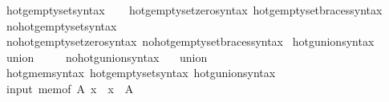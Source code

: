 \begin{isabellebody}
\isanewline
\isanewline
{}\isamarkupfalse%
\ hotg{\isacharunderscore}{\kern0pt}emptyset{\isacharunderscore}{\kern0pt}syntax\isanewline
{}\isanewline
\ \ \isamarkupfalse%
\ hotg{\isacharunderscore}{\kern0pt}emptyset{\isacharunderscore}{\kern0pt}zero{\isacharunderscore}{\kern0pt}syntax\ hotg{\isacharunderscore}{\kern0pt}emptyset{\isacharunderscore}{\kern0pt}braces{\isacharunderscore}{\kern0pt}syntax\isanewline
{}\isamarkupfalse%
\isanewline
{}\isamarkupfalse%
\ no{\isacharunderscore}{\kern0pt}hotg{\isacharunderscore}{\kern0pt}emptyset{\isacharunderscore}{\kern0pt}syntax\isanewline
{}\isanewline
\ \ \isamarkupfalse%
\ no{\isacharunderscore}{\kern0pt}hotg{\isacharunderscore}{\kern0pt}emptyset{\isacharunderscore}{\kern0pt}zero{\isacharunderscore}{\kern0pt}syntax\ no{\isacharunderscore}{\kern0pt}hotg{\isacharunderscore}{\kern0pt}emptyset{\isacharunderscore}{\kern0pt}braces{\isacharunderscore}{\kern0pt}syntax\isanewline
{}\isamarkupfalse%
\isanewline
\isanewline
{}\isamarkupfalse%
\ hotg{\isacharunderscore}{\kern0pt}union{\isacharunderscore}{\kern0pt}syntax\ \ \isamarkupfalse%
\ union\ {\isacharparenleft}{\kern0pt}{\isachardoublequoteopen}{\isasymUnion}{\isacharunderscore}{\kern0pt}{\isachardoublequoteclose}\ {\isacharbrackleft}{\kern0pt}{}{}{\isacharbrackright}{\kern0pt}\ {}{}{\isacharparenright}{\kern0pt}\ \isamarkupfalse%
\isanewline
{}\isamarkupfalse%
\ no{\isacharunderscore}{\kern0pt}hotg{\isacharunderscore}{\kern0pt}union{\isacharunderscore}{\kern0pt}syntax\ \ \isamarkupfalse%
\ union\ {\isacharparenleft}{\kern0pt}{\isachardoublequoteopen}{\isasymUnion}{\isacharunderscore}{\kern0pt}{\isachardoublequoteclose}\ {\isacharbrackleft}{\kern0pt}{}{}{\isacharbrackright}{\kern0pt}\ {}{}{\isacharparenright}{\kern0pt}\ \isamarkupfalse%
\isanewline
\isanewline
{}\isamarkupfalse%
\ hotg{\isacharunderscore}{\kern0pt}mem{\isacharunderscore}{\kern0pt}syntax\ hotg{\isacharunderscore}{\kern0pt}emptyset{\isacharunderscore}{\kern0pt}syntax\ hotg{\isacharunderscore}{\kern0pt}union{\isacharunderscore}{\kern0pt}syntax\isanewline
\isanewline
{}\isamarkupfalse%
\ {\isacharparenleft}{\kern0pt}input{\isacharparenright}{\kern0pt}\ {\isachardoublequoteopen}mem{\isacharunderscore}{\kern0pt}of\ A\ x\ {\isasymequiv}\ x\ {\isasymin}\ A{\isachardoublequoteclose}\isanewline

\end{isabellebody}

